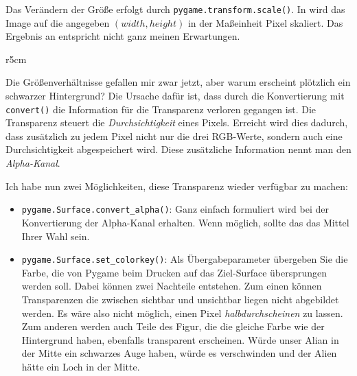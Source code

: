 Das Verändern der Größe erfolgt durch \texttt{pygame.transform.scale()}. In  wird das Image auf die angegeben $(width, height)$ in der Maßeinheit Pixel skaliert. Das Ergebnis an  entspricht nicht ganz meinen Erwartungen.  

\begin{wrapfigure}{r}{5cm}
\end{wrapfigure}
Die Größenverhältnisse gefallen mir zwar jetzt, aber warum erscheint plötzlich ein schwarzer Hintergrund? Die Ursache dafür ist, dass durch die Konvertierung mit \texttt{convert()} die Information für die Transparenz verloren gegangen ist. Die Transparenz steuert die \emph{Durchsichtigkeit} eines Pixels. Erreicht wird dies dadurch, dass zusätzlich zu jedem Pixel nicht nur die drei RGB-Werte, sondern auch eine Durchsichtigkeit abgespeichert wird. Diese zusätzliche Information nennt man den \emph{Alpha-Kanal}.

Ich habe nun zwei Möglichkeiten, diese Transparenz wieder verfügbar zu machen:
\begin{itemize}
	\item \texttt{pygame.Surface.convert\_alpha()}: Ganz einfach formuliert wird bei der Konvertierung der Alpha-Kanal erhalten. Wenn möglich, sollte das das Mittel Ihrer Wahl sein.
	
	\item \texttt{pygame.Surface.set\_colorkey()}: Als Übergabeparameter übergeben Sie die Farbe, die von Pygame beim Drucken auf das Ziel-Surface übersprungen werden soll. Dabei können zwei Nachteile entstehen. Zum einen können Transparenzen die zwischen sichtbar und unsichtbar liegen nicht abgebildet werden. Es wäre also nicht möglich, einen Pixel \emph{halbdurchscheinen} zu lassen. Zum anderen werden auch Teile des Figur, die die gleiche Farbe wie der Hintergrund haben, ebenfalls transparent erscheinen. Würde unser Alian in der Mitte ein schwarzes Auge haben, würde es verschwinden und der Alien hätte ein Loch in der Mitte.
\end{itemize}


